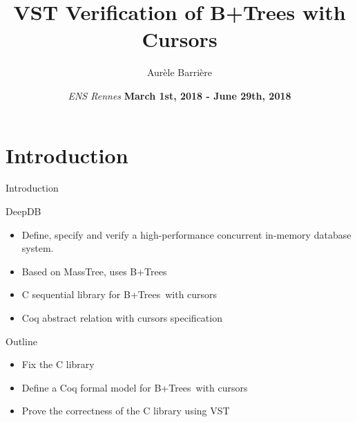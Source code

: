 \documentclass[page number,usenames,dvipsnames]{beamer}
\def\outline{
  \begin{frame}[plain,noframenumbering]
    \frametitle{Outline}
    \tableofcontents[currentsection]
  \end{frame}
}
\def\btrees{B+Trees}
\begin{document}
\title[shorttitle]{VST Verification of B+Trees with Cursors}

\author[Aur\`ele Barri\`ere]{Aur\`ele Barri\`ere}

\date{\textit{ENS Rennes}
  \vfill
  \textbf{March 1st, 2018 - June 29th, 2018}}

\def\outline{
  \begin{frame}[plain,noframenumbering]
    \frametitle{Outline}
    \tableofcontents[currentsection]
  \end{frame}
}



\begin{frame}
  \vspace{-2cm}
  \maketitle
  \vspace{-4cm}
\end{frame}



\section{Introduction}
\begin{frame}{Introduction}
  \begin{block}{DeepDB}
    \begin{itemize}
    \item Define, specify and verify a high-performance concurrent in-memory database system.
    \item Based on MassTree, uses \btrees
    \item C sequential library for \btrees\ with cursors
    \item Coq abstract relation with cursors specification
    \end{itemize}
  \end{block}
  \vfill
  \begin{exampleblock}{Outline}
    \begin{itemize}
    \item Fix the C library
    \item Define a Coq formal model for \btrees\ with cursors
    \item Prove the correctness of the C library using VST
    \end{itemize}
  \end{exampleblock}
      
\end{frame}
\end{document}
